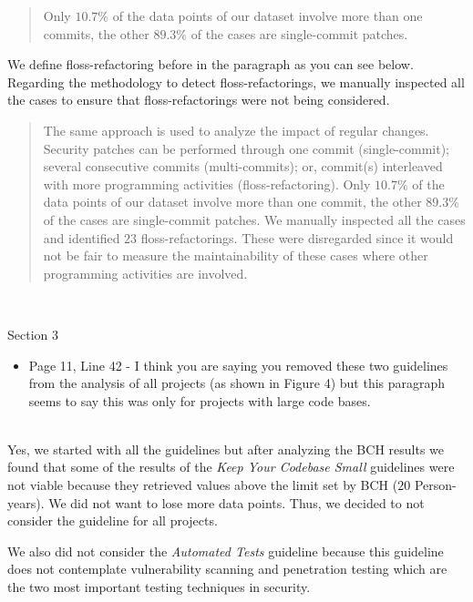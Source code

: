 \documentclass[11pt,fleqn]{article}
\newcommand{\eline}{\vspace*{.75\baselineskip}}
\newcommand{\Referee}[1]{\eline \noindent {\bf Reviewer comment #1:} \\}
\newcommand{\Us}{\eline \noindent {\bf Response:}\\}
\newenvironment{revcomment}[1][]
{\Referee{#1}\begin{rcomment}}
{\end{rcomment}}
\begin{document}
\begin{quote}
    Only $10.7\%$ of the data points 
of our dataset involve more than one commits, the other
$89.3\%$ of the cases are single-commit patches.
\end{quote}

We define floss-refactoring before in the paragraph
as you can see below. Regarding the methodology to detect floss-refactorings, 
we manually inspected all the cases to ensure that 
floss-refactorings were not being considered. 

\begin{quote}
    The same approach is used to analyze the impact of regular 
    changes. Security patches can be performed through one commit (single-commit); 
    several consecutive commits (multi-commits); or, commit(s) interleaved with more 
    programming activities (floss-refactoring). Only $10.7\%$ of the data points 
    of our dataset involve more than one commit, the other
    $89.3\%$ of the cases are single-commit patches. We manually 
    inspected all the cases and identified $23$ floss-refactorings. 
    These were disregarded since it would not be fair to measure the 
    maintainability of these cases where other programming activities 
    are involved.
\end{quote}


\begin{revcomment}[2.14]
    Section 3\\
    \begin{itemize}
        \item Page 11, Line 42 - I think you are saying you removed these two guidelines 
        from the analysis of all projects (as shown in Figure 4) but this paragraph seems 
        to say this was only for projects with large code bases.
    \end{itemize}
\end{revcomment}

\Us Yes, we started with all the guidelines but after analyzing the BCH results 
we found that some of the results of the \emph{Keep Your Codebase Small} guidelines were not viable
because they retrieved values above the limit set by BCH ($20$ Person-years). We did not want 
to lose more data points. Thus, we decided to not consider the guideline for all projects.

We also did not consider the \emph{Automated Tests} guideline because
this guideline does not contemplate vulnerability scanning and penetration testing
which are the two most important testing techniques in security. 
\end{document}
